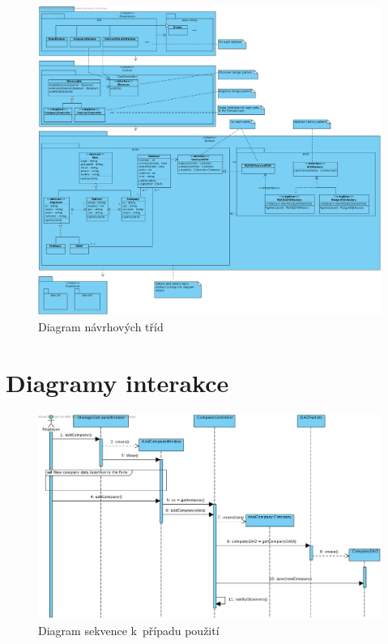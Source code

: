 \begin{figure}[H]
	\begin{center}
		\includegraphics[width=16cm,keepaspectratio]{include/class_stage1}
	\end{center}
	\caption{Diagram návrhových tříd}
	\label{fig:ClassStage1}
\end{figure}

\pagebreak

\section*{Diagramy interakce}

\begin{figure}[H]
	\begin{center}
		\includegraphics[width=16cm,keepaspectratio]{include/seq_add_company}
	\end{center}
	\caption{Diagram sekvence k~případu použití }
	\label{fig:SeqAddCompany}
\end{figure}

